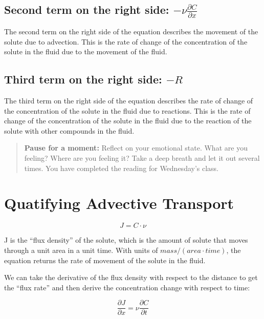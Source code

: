 \documentclass{tufte-handout}\usepackage[]{graphicx}\usepackage[]{xcolor}
\begin{document}
\subsection{Second term on the right side: $- \nu \frac{\partial C}{\partial x}$}

The second term on the right side of the equation describes the movement of the solute due to advection. This is the rate of change of the concentration of the solute in the fluid due to the movement of the fluid.

\subsection{Third term on the right side: $- R$}

The third term on the right side of the equation describes the rate of change of the concentration of the solute in the fluid due to reactions. This is the rate of change of the concentration of the solute in the fluid due to the reaction of the solute with other compounds in the fluid.

\begin{quote}
\textbf{Pause for a moment:} Reflect on your emotional state. What are you feeling? Where are you feeling it? Take a deep breath and let it out several times. You have completed the reading for Wednesday's class.
\end{quote}

\section{Quatifying Advective Transport}

\begin{equation}
  J = C \cdot \nu
\end{equation}

J is the ``flux density'' of the solute, which is the amount of solute that moves through a unit area in a unit time. With units of $mass / (area \cdot time)$, the equation returns the rate of movement of the solute in the fluid.


We can take the derivative of the flux density with respect to the distance to get the ``flux rate'' and then derive the concentration change with respect to time: 

\begin{equation}
  \frac{\partial J}{\partial x} = \nu \frac{\partial C}{\partial t}
\end{equation}
\end{document}
